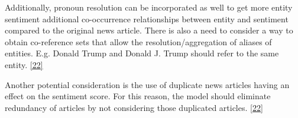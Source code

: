 Additionally, pronoun resolution can be incorporated as well to get more entity sentiment additional co-occurrence relationships between entity and sentiment compared to the original news article. There is also a need to consider a way to obtain co-reference sets that allow the resolution/aggregation of aliases of entities. E.g. Donald Trump and Donald J. Trump should refer to the same entity. \hyperlink{22}{[22]}

Another potential consideration is the use of duplicate news articles having an effect on the sentiment score. For this reason, the model should eliminate redundancy of articles by not considering those duplicated articles. \hyperlink{22}{[22]} 
